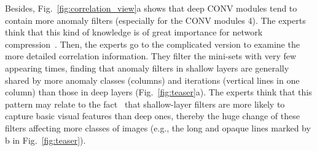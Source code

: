 \documentclass[format=acmsmall, review=false, screen=true]{acmart}
\newcommand{\ti}{\textcolor[rgb]{0,0,0}}
\begin{document}
Besides, Fig.~\ref{fig:correlation_view}a shows that deep CONV modules tend to contain more anomaly filters (especially for the CONV modules 4). The experts think that this kind of knowledge is of great importance for network compression~\cite{han2015deep}.
Then, the experts go to the complicated version to examine the more detailed correlation information.
They filter the mini-sets with very few appearing times, finding that anomaly filters in shallow layers are generally shared by more anomaly classes (columns) and iterations (vertical lines in one column) than those in deep layers (Fig.~\ref{fig:teaser}a).
The experts think that this pattern may relate to the fact~\cite{veit2016residual} that shallow-layer filters are more likely to capture basic visual features than deep ones, thereby the huge change of these filters affecting more classes of images (e.g., the long and opaque lines marked by b in Fig.~\ref{fig:teaser}).
\end{document}
